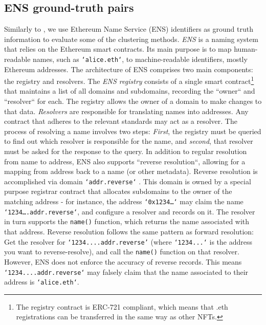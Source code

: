 \documentclass[12pt,a4paper,titlepage,oneside,english]{article}
\begin{document}
\subsection{ENS ground-truth pairs}
\label{sec:ens}
Similarly to \cite{Beres2020}, we use Ethereum Name Service (ENS) identifiers as ground truth information to evaluate some of the clustering methods.\newline
\textit{ENS} is a naming system that relies on the Ethereum smart contracts. Its main purpose is to map human-readable names, such as \texttt{`alice.eth`}, to machine-readable identifiers, mostly Ethereum addresses. The architecture of ENS comprises two main components: the registry and resolvers. \newline
The \textit{ENS registry} consists of a single smart contract\footnote{The registry contract is ERC-721 compliant, which means that .eth registrations can be transferred in the same way as other NFTs.} that maintains a list of all domains and subdomains, recording the ``owner`` and ``resolver`` for each. The registry allows the owner of a domain to make changes to that data. \citep{ENSdocs} %
\newline
\textit{Resolvers} are responsible for %
 translating names into addresses. Any contract that adheres to the relevant standards may act as a resolver. The process of resolving a name involves two steps: \textit{First}, the registry must be queried to find out which resolver is responsible for the name, and \textit{second}, that resolver must be asked for the response to the query. \newline
In addition to regular resolution from name to address, ENS also supports ``reverse resolution``, allowing for a mapping from address back to a name (or other metadata). Reverse resolution is accomplished via %
 domain \texttt{`addr.reverse`}%
. This domain is owned by a special purpose registrar contract that allocates subdomains to the owner of the matching address - for instance, the address \texttt{`0x1234\dots`} may claim the name \texttt{`1234\dots.addr.reverse`}, and configure a resolver and records on it. The resolver in turn supports the \texttt{name()} function, which returns the name associated with that address.\newline
 Reverse resolution %
 follows the same pattern as forward resolution: Get the resolver for \texttt{`1234....addr.reverse'} (where \texttt{`1234...`} is the address you want to reverse-resolve), and call the \texttt{name()} function on that resolver. However, ENS does not enforce the accuracy of reverse records. This means \texttt{`1234....addr.reverse`} may falsely claim that the name associated to their address is \texttt{`alice.eth`}. 
 
\end{document}
